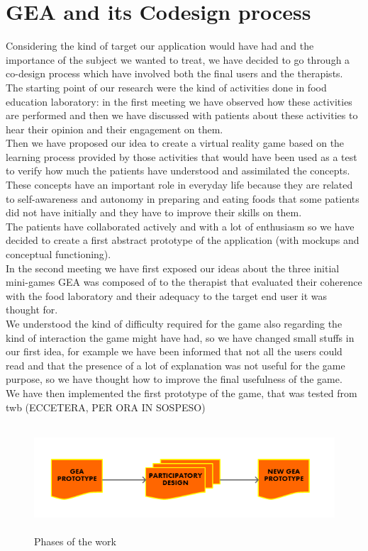 \section{GEA and its Codesign process}
Considering the kind of target our application would have had and the importance of the subject we wanted to treat, we have decided to go through a co-design process which have involved both the final users and the therapists.\\
The starting point of our research were the kind of activities done in food education laboratory: in the first meeting we have observed how these activities are performed and then we have discussed with patients about these activities to hear their opinion and their engagement on them.\\
Then we have proposed our idea to create a virtual reality game based on the learning process provided by those activities that would have been used as a test to verify how much the patients have understood and assimilated the concepts.\\
These concepts have an important role in everyday life because they are related to self-awareness and autonomy in preparing and eating foods that some patients did not have initially and they have to improve their skills on them.\\
The patients have collaborated actively and with a lot of enthusiasm so we have decided to create a first abstract prototype of the application (with mockups and conceptual functioning).\\
In the second meeting we have first exposed our ideas about the three initial mini-games GEA was composed of to the therapist that evaluated their coherence with the food laboratory and their adequacy to the target end user it was thought for. \\
We understood the kind of difficulty required for the game also regarding the kind of interaction the game might have had, so we have changed small stuffs in our first idea, for example we have been informed that not all the users could read and that the presence of a lot of explanation was not useful for the game purpose, so we have thought how to improve the final usefulness of the game.\\
We have then implemented the first prototype of the game, that was tested from twb (ECCETERA, PER ORA IN SOSPESO)
\begin{figure}[H]
\centering
\includegraphics[width=12cm, height=4cm]{immagini/PD.png}
\caption{Phases of the work}\label{fig:phases}
\end{figure}

